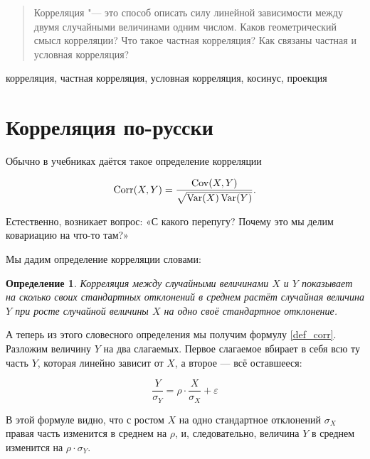 \documentclass[10pt]{article}
\begin{document}


\DoFirstPageTechnicalStuff


\newtheorem{theorem}{Теорема}
\newtheorem{definition}{Определение}

\begin{abstract}
Корреляция "--- это способ описать силу линейной зависимости между двумя случайными величинами одним числом. Каков геометрический смысл корреляции? Что такое частная корреляция? Как связаны частная и условная корреляция? 
\end{abstract}

\begin{keyword}
корреляция, частная корреляция, условная корреляция, косинус, проекция
\end{keyword}



\section{Корреляция по-русски}

Обычно в учебниках даётся такое определение корреляции

\begin{equation}
\label{def_corr}
\operatorname{Corr}(X,Y)=\frac{\operatorname{Cov}(X,Y)}{\sqrt{\operatorname{Var}(X)\operatorname{Var}(Y)}}.
\end{equation}

Естественно, возникает вопрос: «С какого перепугу? Почему это мы делим ковариацию на что-то там?»

Мы дадим определение корреляции словами:

\begin{definition}
Корреляция между случайными величинами $X$ и $Y$ показывает на сколько своих стандартных отклонений в среднем растёт случайная величина $Y$ при росте случайной величины $X$ на одно своё стандартное отклонение.
\end{definition}

А теперь из этого словесного определения мы получим формулу \ref{def_corr}. Разложим величину $Y$ на два слагаемых. Первое слагаемое вбирает в себя всю ту часть $Y$, которая линейно зависит от $X$, а второе --- всё оставшееся:

\[
\frac{Y}{\sigma_Y}=\rho \cdot \frac{X}{\sigma_X} + \varepsilon
\]

В этой формуле видно, что с ростом $X$ на одно стандартное отклонений $\sigma_X$ правая часть изменится в среднем на $\rho$, и, следовательно, величина $Y$ в среднем изменится на $\rho \cdot \sigma_Y$. 
\end{document}
